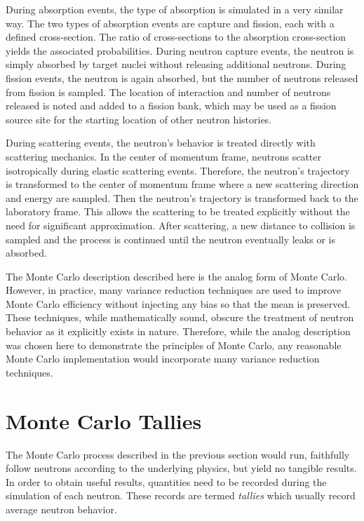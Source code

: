During absorption events, the type of absorption is simulated in a very similar way. The two types of absorption events are capture and fission, each with a defined cross-section. The ratio of cross-sections to the absorption cross-section yields the associated probabilities. During neutron capture events, the neutron is simply absorbed by target nuclei without releasing additional neutrons. During fission events, the neutron is again absorbed, but the number of neutrons released from fission is sampled. The location of interaction and number of neutrons released is noted and added to a fission bank, which may be used as a fission source site for the starting location of other neutron histories.

During scattering events, the neutron's behavior is treated directly with scattering mechanics. In the center of momentum frame, neutrons scatter isotropically during elastic scattering events. Therefore, the neutron's trajectory is transformed to the center of momentum frame where a new scattering direction and energy are sampled. Then the neutron's trajectory is transformed back to the laboratory frame. This allows the scattering to be treated explicitly without the need for significant approximation. After scattering, a new distance to collision is sampled and the process is continued until the neutron eventually leaks or is absorbed. 


The Monte Carlo description described here is the analog form of Monte Carlo. However, in practice, many variance reduction techniques are used to improve Monte Carlo efficiency without injecting any bias so that the mean is preserved. These techniques, while mathematically sound, obscure the treatment of neutron behavior as it explicitly exists in nature. Therefore, while the analog description was chosen here to demonstrate the principles of Monte Carlo, any reasonable Monte Carlo implementation would incorporate many variance reduction techniques.

\section{Monte Carlo Tallies}
\label{sec:mc-tallies}

The Monte Carlo process described in the previous section would run, faithfully follow neutrons according to the underlying physics, but yield no tangible results. In order to obtain useful results, quantities need to be recorded during the simulation of each neutron. These records are termed \textit{tallies} which usually record average neutron behavior.

